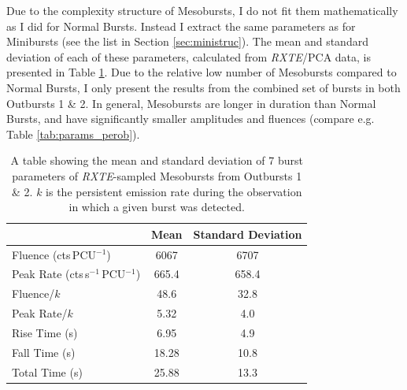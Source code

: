 \label{sec:mesostruc}

\par Due to the complexity structure of Mesobursts, I do not fit them mathematically as I did for Normal Bursts.  Instead I extract the same parameters as for Minibursts (see the list in Section \ref{sec:ministruc}).  The mean and standard deviation of each of these parameters, calculated from \indexpca\textit{RXTE}/PCA data, is presented in Table \ref{tab:meso_param}.  Due to the relative low number of Mesobursts compared to Normal Bursts, I only present the results from the combined set of bursts in both Outbursts 1 \& 2.  In general, Mesobursts are longer in duration than Normal Bursts, and have significantly smaller amplitudes and fluences (compare e.g. Table \ref{tab:params_perob}).

\begin{table}
\centering
\begin{tabular}{l c c}
\hline
\hline
&Mean&Standard Deviation\\
\hline
Fluence \scriptsize(cts\,PCU$^{-1}$)&6067&6707\\
Peak Rate \scriptsize(cts\,s$^{-1}$\,PCU$^{-1}$)&665.4&658.4\\
Fluence/$k$&48.6&32.8\\
Peak Rate/$k$&5.32&4.0\\
Rise Time \scriptsize(s)&6.95&4.9\\
Fall Time \scriptsize(s)&18.28&10.8\\
Total Time \scriptsize(s)&25.88&13.3\\
\hline
\hline
\end{tabular}
\caption[A table showing the mean and standard deviation of 7 burst parameters of \textit{RXTE}-sampled Mesobursts from the 1996 \& 1997 outbursts.]{A table showing the mean and standard deviation of 7 burst parameters of \indexrxte\textit{RXTE}-sampled Mesobursts from Outbursts 1 \& 2.  $k$ is the persistent emission rate during the observation in which a given burst was detected.}
\label{tab:meso_param}
\end{table}

